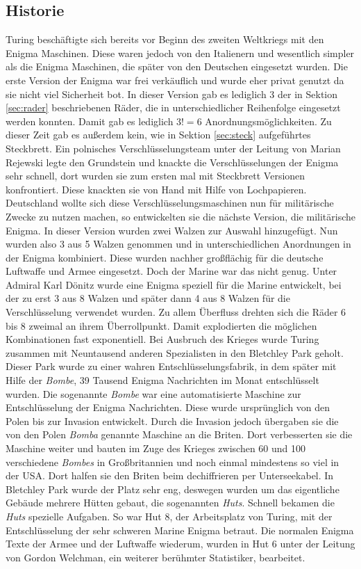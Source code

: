 \subsection{Historie}
Turing beschäftigte sich bereits vor Beginn des zweiten Weltkriegs mit den Enigma Maschinen. Diese waren jedoch von den Italienern und wesentlich simpler als die Enigma Maschinen, die später von den Deutschen eingesetzt wurden. Die erste Version der Enigma war frei verkäuflich und wurde eher privat genutzt da sie nicht viel Sicherheit bot. In dieser Version gab es lediglich 3 der in Sektion \ref{sec:rader} beschriebenen Räder, die in unterschiedlicher Reihenfolge eingesetzt werden konnten. Damit gab es lediglich $3! = 6$ Anordnungsmöglichkeiten. Zu dieser Zeit gab es außerdem kein, wie in Sektion \ref{sec:steck} aufgeführtes Steckbrett. Ein polnisches Verschlüsselungsteam unter der Leitung von Marian Rejewski legte den Grundstein und knackte die Verschlüsselungen der Enigma sehr schnell, dort wurden sie zum ersten mal mit Steckbrett Versionen konfrontiert. Diese knackten sie von Hand mit Hilfe von Lochpapieren. Deutschland wollte sich diese Verschlüsselungsmaschinen nun für militärische Zwecke zu nutzen machen, so entwickelten sie die nächste Version, die militärische Enigma. In dieser Version wurden zwei Walzen zur Auswahl hinzugefügt. Nun wurden also 3 aus 5 Walzen genommen und in unterschiedlichen Anordnungen in der Enigma kombiniert. Diese wurden nachher großflächig für die deutsche Luftwaffe und Armee eingesetzt. Doch der Marine war das nicht genug. Unter Admiral Karl Dönitz wurde eine Enigma speziell für die Marine entwickelt, bei der zu erst 3 aus 8 Walzen und später dann 4 aus 8 Walzen für die Verschlüsselung verwendet wurden. Zu allem Überfluss drehten sich die Räder 6 bis 8 zweimal an ihrem Überrollpunkt. Damit explodierten die möglichen Kombinationen fast exponentiell. Bei Ausbruch des Krieges wurde Turing zusammen mit Neuntausend anderen Spezialisten in den Bletchley Park geholt. Dieser Park wurde zu einer wahren Entschlüsselungsfabrik, in dem später mit Hilfe der \emph{Bombe}, 39 Tausend Enigma Nachrichten im Monat entschlüsselt wurden. Die sogenannte \emph{Bombe} war eine automatisierte Maschine zur Entschlüsselung der Enigma Nachrichten. Diese wurde ursprünglich von den Polen bis zur Invasion entwickelt. Durch die Invasion jedoch übergaben sie die von den Polen \emph{Bomba} genannte Maschine an die Briten. Dort verbesserten sie die Maschine weiter und bauten im Zuge des Krieges zwischen 60 und 100 verschiedene \emph{Bombes} in Großbritannien und noch einmal mindestens so viel in der USA. Dort halfen sie den Briten beim dechiffrieren per Unterseekabel. In Bletchley Park wurde der Platz sehr eng, deswegen wurden um das eigentliche Gebäude mehrere Hütten gebaut, die sogenannten \emph{Huts}. Schnell bekamen die \emph{Huts} spezielle Aufgaben. So war Hut 8, der Arbeitsplatz von Turing, mit der Entschlüsselung der sehr schweren Marine Enigma betraut. Die normalen Enigma Texte der Armee und der Luftwaffe wiederum, wurden in Hut 6 unter der Leitung von Gordon Welchman, ein weiterer berühmter Statistiker, bearbeitet.  \cite{enigmaproblem1} \cite{theessentialturing}

